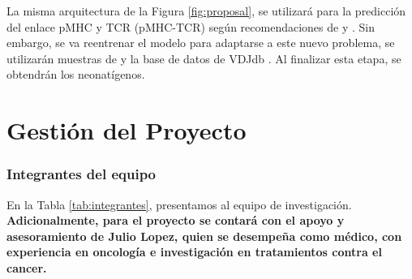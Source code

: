 \documentclass[a4paper,11pt]{article}
\begin{document}





La misma arquitectura de la Figura \ref{fig:proposal}, se utilizará para la predicción del enlace pMHC y TCR (pMHC-TCR) según recomendaciones de \cite{li2020progeo}  y \cite{myronov2023bertrand}. Sin embargo, se va reentrenar el modelo para adaptarse a este nuevo problema, se utilizarán muestras de \cite{li2020progeo} y la base de datos de VDJdb \citep{shugay2018vdjdb}. Al finalizar esta etapa, se obtendrán los neonatígenos.



	
 {\small
	
}

\clearpage


\part*{Gestión del Proyecto}

\setcounter{section}{0}


\section{Integrantes del equipo}
En la Tabla \ref{tab:integrantes}, presentamos al equipo de investigación. \textbf{Adicionalmente, para el proyecto se contará con el apoyo y asesoramiento de Julio Lopez, quien se desempeña como médico, con experiencia en oncología e investigación en tratamientos contra el cancer.}
 
\end{document}
